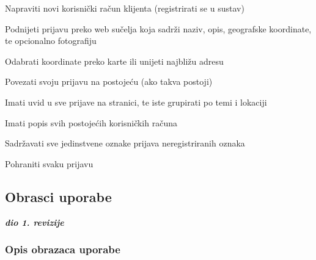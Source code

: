 \begin{packed_enum}
				\item  {}
				
				\begin{packed_enum}
					\item Napraviti novi korisnički račun klijenta (registrirati se u sustav)
					\item Podnijeti prijavu preko web sučelja koja sadrži naziv, opis, geografske koordinate, te opcionalno fotografiju
					\item Odabrati koordinate preko karte ili unijeti najbližu adresu
					\item Povezati svoju prijavu na postojeću (ako takva postoji)
					\item Imati uvid u sve prijave na stranici, te iste grupirati po temi i lokaciji

				\end{packed_enum}
				
				\item  {}
				
				\begin{packed_enum}
				\item Imati popis svih postojećih korisničkih računa
				\item Sadržavati sve jedinstvene oznake prijava neregistriranih oznaka
				\item Pohraniti svaku prijavu
					
				\end{packed_enum}
			\end{packed_enum}
			\eject 
			
			
				
			\subsection{Obrasci uporabe}
				
				\textbf{\textit{dio 1. revizije}}
				
				\subsubsection{Opis obrazaca uporabe}
					

